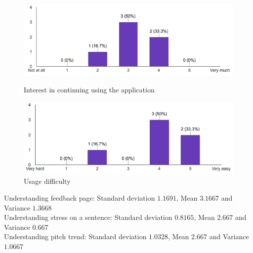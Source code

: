 \begin{figure}[!ht]
	\centering
	\begin{minipage}{.5\textwidth}
		\centering
		\includegraphics[scale=0.5]{Figures/responses/application_usage.png}
		\caption{Interest in continuing using the application}
		\label{fig:int_improving_lang}
	\end{minipage}%
	\begin{minipage}{.5\textwidth}
		\centering
		\includegraphics[scale=0.5]{Figures/responses/application_usage_difficulty.png}
		\caption{Usage difficulty}
		\label{fig:int_learnign_lang}
	\end{minipage}
\end{figure}

\noindent Understanding feedback page: Standard deviation $1.1691$, Mean $3.1667$ and Variance $1.3668$ \\
\noindent Understanding stress on a sentence: Standard deviation $0.8165$, Mean $2.667$ and Variance $0.667$ \\
\noindent Understanding pitch trend: Standard deviation $1.0328$, Mean $2.667$ and Variance $1.0667$

